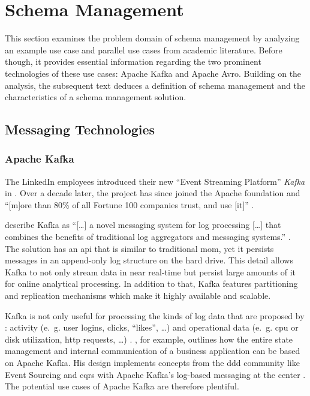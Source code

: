 
\section{Schema Management}\label{sec:schema-management}

This section examines the problem domain of schema management by analyzing an example use case and parallel use cases from academic literature.
Before though, it provides essential information regarding the two prominent technologies of these use cases: Apache Kafka and Apache Avro.
Building on the analysis, the subsequent text deduces a definition of schema management and the characteristics of a schema management solution.

\subsection{Messaging Technologies}

\subsubsection{Apache Kafka}

The LinkedIn employees \citeauthor{kreps_kafka_2011} introduced their new \enquote{Event Streaming Platform} \emph{Kafka} in \citeyear{kreps_kafka_2011} \parencite{kreps_kafka_2011}.
Over a decade later, the project has since joined the Apache foundation and \enquote{[m]ore than 80\% of all Fortune 100 companies trust, and use [it]} \parencite{apache_software_foundation_apache_nodate}.

\citeauthor{kreps_kafka_2011} describe Kafka as \enquote{[\ldots] a novel messaging system for log processing [\ldots] that combines the benefits of traditional log aggregators and messaging systems.} \parencite{kreps_kafka_2011}.
The solution has an \gls{api} that is similar to traditional \gls{mom}, yet it persists messages in an append-only log structure on the hard drive.
This detail allows Kafka to not only stream data in near real-time but persist large amounts of it for online analytical processing.
In addition to that, Kafka features partitioning and replication mechanisms which make it highly available and scalable. \parencite{kreps_kafka_2011}

Kafka is not only useful for processing the kinds of log data that are proposed by \citeauthor{kreps_kafka_2011}: activity (e.~g. user logins, clicks, \enquote{likes}, \ldots) and operational data (e.~g. \gls{cpu} or disk utilization, \gls{http} requests, \ldots) \parencite{kreps_kafka_2011}.
\citeauthor{stopford_designing_2018}, for example, outlines how the entire state management and internal communication of a business application can be based on Apache Kafka.
His design implements concepts from the \gls{ddd} community like Event Sourcing \parencite{fowler_event_sourcing_2005} and \gls{cqrs} \parencite{fowler_cqrs_2011} with Apache Kafka's log-based messaging at the center \parencite{stopford_designing_2018}.
The potential use cases of Apache Kafka are therefore plentiful.

